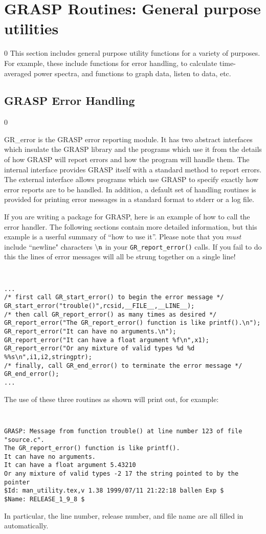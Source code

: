 \section{GRASP Routines: General purpose utilities}
\label{s:utility}
\setcounter{equation}0
This section includes general purpose utility functions for a variety
of purposes.  For example, these include functions for error handling,
to calculate time-averaged power spectra, and functions to graph data,
listen to data, etc.
\clearpage
\subsection{GRASP Error Handling}
\setcounter{equation}0
\label{ss:errors}

GR\_error is the GRASP error reporting module.  It has two abstract
interfaces which insulate the GRASP library and the programs which use
it from the details of how GRASP will report errors and how the program
will handle them.  The internal interface provides GRASP itself with a
standard method to report errors.  The external interface allows
programs which use GRASP to specify exactly how error reports are to be
handled.  In addition, a default set of handling routines is provided
for printing error messages in a standard format to stderr or a log
file.

If you are writing a package for GRASP, here is an example of how to
call the error handler.  The following sections contain more detailed
information, but this example is a userful summary of ``how to use
it''. Please note that you {\it must} include ``newline" characters
${\tt \backslash n}$ in your {\tt GR\_report\_error()} calls.  If you fail to do
this the lines of error messages will all be strung together on a single line!
{\tt 
\begin{verbatim}
...
/* first call GR_start_error() to begin the error message */
GR_start_error("trouble()",rcsid,__FILE__,__LINE__);
/* then call GR_report_error() as many times as desired */
GR_report_error("The GR_report_error() function is like printf().\n");
GR_report_error("It can have no arguments.\n");
GR_report_error("It can have a float argument %f\n",x1);
GR_report_error("Or any mixture of valid types %d %d %%s\n",i1,i2,stringptr);
/* finally, call GR_end_error() to terminate the error message */
GR_end_error();
...
\end{verbatim}}
\noindent
The use of these three routines as shown will print out, for example:
{\tt 
\begin{verbatim}
GRASP: Message from function trouble() at line number 123 of file "source.c".
The GR_report_error() function is like printf().
It can have no arguments.
It can have a float argument 5.43210
Or any mixture of valid types -2 17 the string pointed to by the pointer
$Id: man_utility.tex,v 1.38 1999/07/11 21:22:18 ballen Exp $
$Name: RELEASE_1_9_8 $
\end{verbatim}}
\noindent
In particular, the line number, release number, and file name are all
filled in automatically. 

